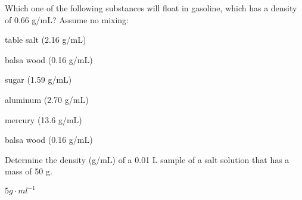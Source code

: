 \documentclass[main.tex]{subfiles}
\begin{document}
\begin{multicols*}{2}
\begin{question}[ID=\the\value{numA}]
Which one of the following substances will float in gasoline, which has a density of 0.66 g/mL?  Assume no mixing:    
  \begin{inparaenum}[(a)]

\item table salt	(2.16 g/mL)
\item balsa wood	(0.16 g/mL)
\item sugar	(1.59 g/mL)
\item aluminum	(2.70 g/mL)
\item mercury	(13.6 g/mL)
 \end{inparaenum}
\end{question}
\begin{solution}
balsa wood	(0.16 g/mL)
\hspace{0.1cm}\end{solution}%

\begin{question}[ID=\the\value{numA}]
Determine the density (g/mL) of a 0.01 L sample of a salt solution that has a mass of 50 g.
\end{question}
\begin{solution}
$5g\cdot ml^{-1}$
\hspace{0.1cm}\end{solution}%


\end{multicols*}
\end{document}
